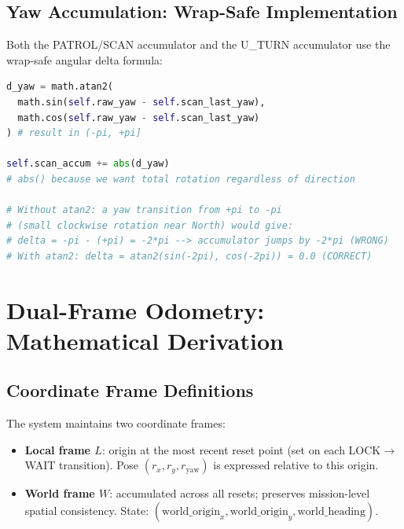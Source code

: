 \subsection{Yaw Accumulation: Wrap-Safe Implementation}

Both the PATROL/SCAN accumulator and the U\_TURN accumulator use the  wrap-safe angular delta formula:

\begin{lstlisting}[language=Python, caption={Wrap-safe yaw delta accumulation}, label={lst:yaw-wrap}]
d_yaw = math.atan2(
  math.sin(self.raw_yaw - self.scan_last_yaw),
  math.cos(self.raw_yaw - self.scan_last_yaw)
) # result in (-pi, +pi]

self.scan_accum += abs(d_yaw)
# abs() because we want total rotation regardless of direction

# Without atan2: a yaw transition from +pi to -pi
# (small clockwise rotation near North) would give:
# delta = -pi - (+pi) = -2*pi --> accumulator jumps by -2*pi (WRONG)
# With atan2: delta = atan2(sin(-2pi), cos(-2pi)) = 0.0 (CORRECT)
\end{lstlisting}

\section{Dual-Frame Odometry: Mathematical Derivation}

\subsection{Coordinate Frame Definitions}

The system maintains two coordinate frames:

\begin{itemize}[leftmargin=1.4em]
  \item \textbf{Local frame $L$}: origin at the most recent reset point (set on each LOCK$\to$WAIT transition). Pose $(r_x, r_y, r_{\text{yaw}})$ is expressed relative to this origin.
  \item \textbf{World frame $W$}: accumulated across all resets; preserves mission-level spatial consistency. State: $(\text{world\_origin}_x, \text{world\_origin}_y, \text{world\_heading})$.
\end{itemize}

